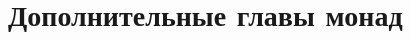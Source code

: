 \documentclass[12pt]{article}
\begin{document}




%
%
%
%
%
%
%
%
%
%


    \section{Дополнительные главы монад}









\end{document}
